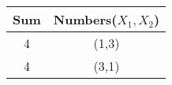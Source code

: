 \begin{tabular}{|c|c|}\hline
  Sum & Numbers($X_1,X_2 $)  \\\hline
  4 & (1,3)  \\\hline
  4 & (3,1) \\\hline
\end{tabular} 
